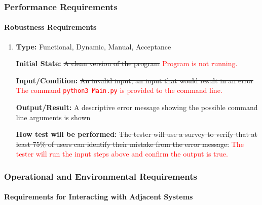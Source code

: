 \documentclass[12pt, titlepage]{article}
\begin{document}
\subsubsection{Performance Requirements}
\label{PerfReqs}
		
\paragraph{Robustness Requirements}

\begin{enumerate}[label=NFR-RR\arabic*:, wide=0pt, leftmargin=*]

\item \phantom{empty}

\textbf{Type:} Functional, Dynamic, Manual, Acceptance
					
\textbf{Initial State:} \sout{A clean version of the program} \textcolor{red}{Program is not running.}
					
\textbf{Input/Condition:} \sout{An invalid input; an input that would result in an error}
\textcolor{red}{The command \texttt{python3 Main.py} is provided to the command line.}
					
\textbf{Output/Result:} A descriptive error message showing the possible command line arguments is shown
					
\textbf{How test will be performed:} \sout{The tester will use a survey to verify that at least 75\% of users can identify their mistake from the error message.}
\textcolor{red}{The tester will run the input steps above and confirm the output is true.}

\end{enumerate}

\subsubsection{Operational and Environmental Requirements}
		
\paragraph{Requirements for Interacting with Adjacent Systems}
\end{document}
